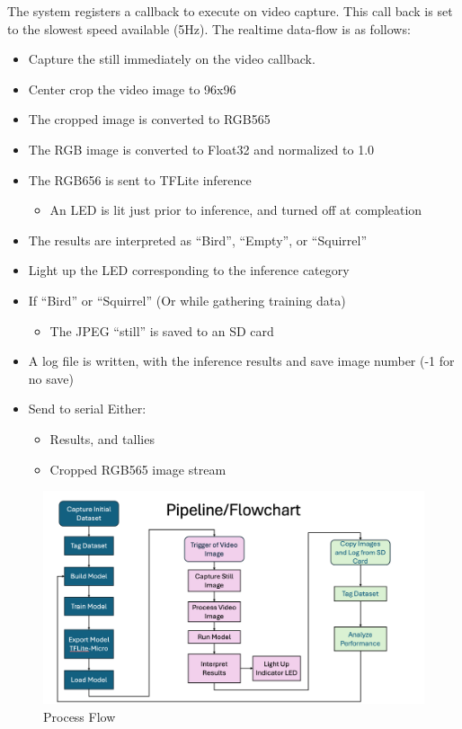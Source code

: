 \documentclass[conference]{IEEEtran}
\begin{document}
The system registers a callback to execute on video capture. This call back is set to the slowest speed available (5Hz).
The realtime data-flow is as follows:    
\begin{itemize}
     \item Capture the still immediately on the video callback.
     \item Center crop the video image to 96x96
     \item The cropped image is converted to RGB565
     \item The RGB image is converted to Float32 and normalized to 1.0
     \item The RGB656 is sent to TFLite inference
     \begin{itemize}
     	\item An LED is lit just prior to inference, and turned off at compleation
     \end{itemize}
     \item The results are interpreted as “Bird”, “Empty”, or “Squirrel”
     \item Light up the LED corresponding to the inference category
     \item If “Bird” or “Squirrel” (Or while gathering training data)
     \begin{itemize}
        \item The JPEG “still” is saved to an SD card
     \end{itemize} 
     \item A log file is written, with the inference results and save image number (-1 for no save)
     \item Send to serial Either:
     \begin{itemize}
        \item  Results, and tallies
        \item Cropped RGB565 image stream
        \end{itemize} 
\end{itemize} 

\begin{figure}[htbp]
\centerline{\includegraphics[scale=.22]{flowChart.png}}
\caption{Process Flow}
\label{flowChart}
\end{figure}
\end{document}
